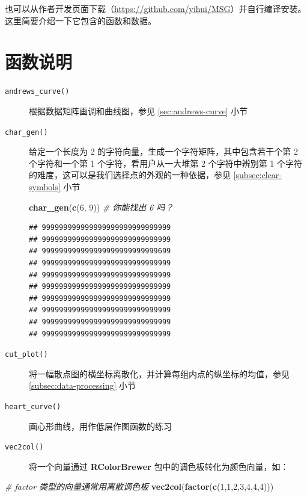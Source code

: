 \documentclass[
  b5paper,
  UTF8,twoside]{book}
\newenvironment{Shaded}{\begin{snugshade}}{\end{snugshade}}
\newcommand{\CommentTok}[1]{\textcolor[rgb]{0.56,0.35,0.01}{\textit{#1}}}
\newcommand{\DecValTok}[1]{\textcolor[rgb]{0.00,0.00,0.81}{#1}}
\newcommand{\FunctionTok}[1]{\textcolor[rgb]{0.13,0.29,0.53}{\textbf{#1}}}
\newcommand{\NormalTok}[1]{#1}
\newcommand{\StringTok}[1]{\textcolor[rgb]{0.31,0.60,0.02}{#1}}
\begin{document}
也可以从作者开发页面下载（\url{https://github.com/yihui/MSG}）并自行编译安装。这里简要介绍一下它包含的函数和数据。

\section{函数说明}\label{sec:MSG-fun}

\begin{description}
\item[\texttt{andrews\_curve()}]
根据数据矩阵画调和曲线图，参见 \ref{sec:andrews-curve} 小节
\item[\texttt{char\_gen()}]
给定一个长度为 2 的字符向量，生成一个字符矩阵，其中包含若干个第 2 个字符和一个第 1 个字符，看用户从一大堆第 2 个字符中辨别第 1 个字符的难度，这可以是我们选择点的外观的一种依据，参见 \ref{subsec:clear-symbols} 小节

\begin{Shaded}
\begin{Highlighting}[]
\FunctionTok{char\_gen}\NormalTok{(}\FunctionTok{c}\NormalTok{(}\StringTok{\textquotesingle{}6\textquotesingle{}}\NormalTok{, }\StringTok{\textquotesingle{}9\textquotesingle{}}\NormalTok{))  }\CommentTok{\# 你能找出 6 吗？}
\end{Highlighting}
\end{Shaded}

\begin{verbatim}
## 999999999999999999999999999999
## 999999999999999999999999999999
## 999999999999999999999999999699
## 999999999999999999999999999999
## 999999999999999999999999999999
## 999999999999999999999999999999
## 999999999999999999999999999999
## 999999999999999999999999999999
## 999999999999999999999999999999
## 999999999999999999999999999999
\end{verbatim}
\item[\texttt{cut\_plot()}]
将一幅散点图的横坐标离散化，并计算每组内点的纵坐标的均值，参见 \ref{subsec:data-processing} 小节
\item[\texttt{heart\_curve()}]
画心形曲线，用作低层作图函数的练习
\item[\texttt{vec2col()}]
将一个向量通过 \textbf{RColorBrewer} 包中的调色板转化为颜色向量，如：
\end{description}

\begin{Shaded}
\begin{Highlighting}[]
\CommentTok{\# factor 类型的向量通常用离散调色板}
\FunctionTok{vec2col}\NormalTok{(}\FunctionTok{factor}\NormalTok{(}\FunctionTok{c}\NormalTok{(}\DecValTok{1}\NormalTok{,}\DecValTok{1}\NormalTok{,}\DecValTok{2}\NormalTok{,}\DecValTok{3}\NormalTok{,}\DecValTok{4}\NormalTok{,}\DecValTok{4}\NormalTok{,}\DecValTok{4}\NormalTok{))) }
\end{Highlighting}
\end{Shaded}
\end{document}
